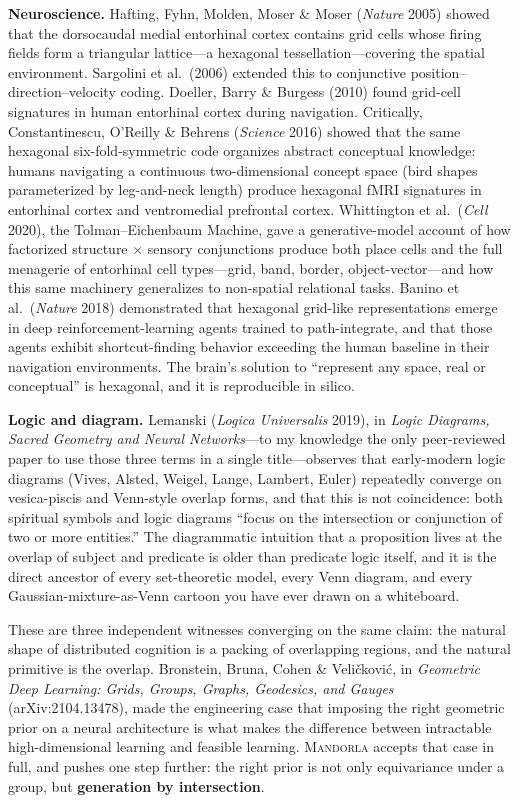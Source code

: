 \documentclass[11pt,a4paper]{article}
\begin{document}
\textbf{Neuroscience.} Hafting, Fyhn, Molden, Moser \& Moser (\emph{Nature} 2005) showed that the dorsocaudal medial entorhinal cortex contains grid cells whose firing fields form a triangular lattice---a hexagonal tessellation---covering the spatial environment. Sargolini et al.\ (2006) extended this to conjunctive position--direction--velocity coding. Doeller, Barry \& Burgess (2010) found grid-cell signatures in human entorhinal cortex during navigation. Critically, Constantinescu, O'Reilly \& Behrens (\emph{Science} 2016) showed that the same hexagonal six-fold-symmetric code organizes abstract conceptual knowledge: humans navigating a continuous two-dimensional concept space (bird shapes parameterized by leg-and-neck length) produce hexagonal fMRI signatures in entorhinal cortex and ventromedial prefrontal cortex. Whittington et al.\ (\emph{Cell} 2020), the Tolman--Eichenbaum Machine, gave a generative-model account of how factorized structure $\times$ sensory conjunctions produce both place cells and the full menagerie of entorhinal cell types---grid, band, border, object-vector---and how this same machinery generalizes to non-spatial relational tasks. Banino et al.\ (\emph{Nature} 2018) demonstrated that hexagonal grid-like representations emerge in deep reinforcement-learning agents trained to path-integrate, and that those agents exhibit shortcut-finding behavior exceeding the human baseline in their navigation environments. The brain's solution to ``represent any space, real or conceptual'' is hexagonal, and it is reproducible in silico.

\textbf{Logic and diagram.} Lemanski (\emph{Logica Universalis} 2019), in \emph{Logic Diagrams, Sacred Geometry and Neural Networks}---to my knowledge the only peer-reviewed paper to use those three terms in a single title---observes that early-modern logic diagrams (Vives, Alsted, Weigel, Lange, Lambert, Euler) repeatedly converge on vesica-piscis and Venn-style overlap forms, and that this is not coincidence: both spiritual symbols and logic diagrams ``focus on the intersection or conjunction of two or more entities.'' The diagrammatic intuition that a proposition lives at the overlap of subject and predicate is older than predicate logic itself, and it is the direct ancestor of every set-theoretic model, every Venn diagram, and every Gaussian-mixture-as-Venn cartoon you have ever drawn on a whiteboard.

These are three independent witnesses converging on the same claim: the natural shape of distributed cognition is a packing of overlapping regions, and the natural primitive is the overlap. Bronstein, Bruna, Cohen \& Veli\v{c}kovi\'c, in \emph{Geometric Deep Learning: Grids, Groups, Graphs, Geodesics, and Gauges} (arXiv:2104.13478), made the engineering case that imposing the right geometric prior on a neural architecture is what makes the difference between intractable high-dimensional learning and feasible learning. \textsc{Mandorla} accepts that case in full, and pushes one step further: the right prior is not only equivariance under a group, but \textbf{generation by intersection}.
\end{document}
